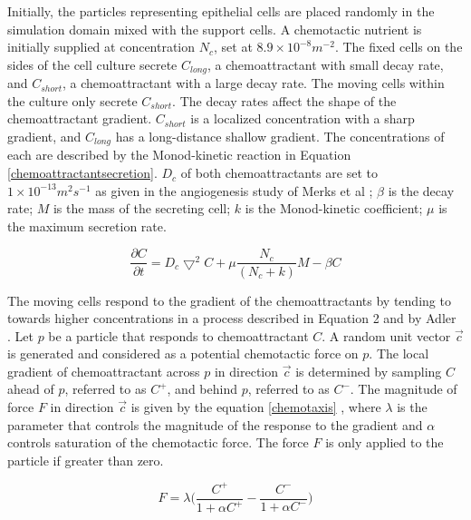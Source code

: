 Initially, the particles representing epithelial cells are placed randomly in the simulation domain mixed with the support cells.  A chemotactic nutrient is initially supplied at concentration $N_{c}$, set at $8.9 \times 10^{-8} m^{-2}$.  The fixed cells on the sides of the cell culture secrete $C_{long}$, a chemoattractant with small decay rate, and $C_{short}$, a chemoattractant with a large decay rate. The moving cells within the culture only secrete $C_{short}$. The decay rates affect the shape of the chemoattractant gradient. $C_{short}$ is a localized concentration with a sharp gradient, and $C_{long}$ has a long-distance shallow gradient.  The concentrations of each are described by the Monod-kinetic reaction in Equation \ref{chemoattractantsecretion}.  $D_{c}$ of both chemoattractants are set to $1 \times 10^{-13} m^{2} s^{-1}$ as given in the  angiogenesis study of Merks et al \cite{delindavis:Merks2008ContactInhibited}; $\beta$ is the decay rate; $M$ is the mass of the secreting cell; $k$ is the Monod-kinetic coefficient; $\mu$ is the maximum secretion rate.

\begin{equation}
\frac{\partial C}{\partial t}=D_{c}\bigtriangledown^{2} C + \mu \frac{N_c}{(N_c +k)} M - \beta C
\label{chemoattractantsecretion}
\end{equation}

The moving cells respond to the gradient of the chemoattractants by tending to towards higher concentrations in a process described in Equation 2 and by Adler \cite{delindavis:chemotaxisbasepaper}. Let $p$ be a particle that responds to chemoattractant $C$. A random unit vector $\vec{c}$ is generated and considered as a potential chemotactic force on $p$. The local gradient of chemoattractant across $p$ in direction $\vec{c}$ is determined by sampling $C$ ahead of $p$, referred to as $C^{+}$, and behind $p$, referred to as $C^{-}$. The magnitude of force $F$ in direction $\vec{c}$ is given by the equation \ref{chemotaxis} \cite{delindavis:Merks2008ContactInhibited}, where $\lambda$ is the parameter that controls the magnitude of the response to the gradient and $\alpha$ controls saturation of the chemotactic force. The force $F$ is only applied to the particle if greater than zero.

\begin{equation}
F = \lambda \Big(\frac{C^{+}}{1 + \alpha C^{+}} - \frac{C^{-}}{1 + \alpha C^{-}}\Big)
\label{chemotaxis}
\end{equation}



